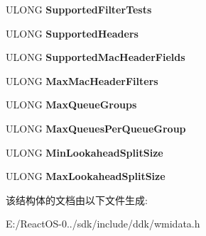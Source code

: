 \begin{DoxyCompactItemize}
U\+L\+O\+NG {\bfseries Supported\+Filter\+Tests}
\item 
\mbox{\label{struct___m_s_ndis___receive_filter_capabilities_a7f4ca155d39f9301cf1ddae7f67b23d5}} 
U\+L\+O\+NG {\bfseries Supported\+Headers}
\item 
\mbox{\label{struct___m_s_ndis___receive_filter_capabilities_a2ee21c94bab2245bd0a6757689ab5de5}} 
U\+L\+O\+NG {\bfseries Supported\+Mac\+Header\+Fields}
\item 
\mbox{\label{struct___m_s_ndis___receive_filter_capabilities_a095d9228914c6269e037776bd1787a7d}} 
U\+L\+O\+NG {\bfseries Max\+Mac\+Header\+Filters}
\item 
\mbox{\label{struct___m_s_ndis___receive_filter_capabilities_a2b1584d60f1bdd312d6ba45753659601}} 
U\+L\+O\+NG {\bfseries Max\+Queue\+Groups}
\item 
\mbox{\label{struct___m_s_ndis___receive_filter_capabilities_adce5e029b627315b59f88c5a45bd01b0}} 
U\+L\+O\+NG {\bfseries Max\+Queues\+Per\+Queue\+Group}
\item 
\mbox{\label{struct___m_s_ndis___receive_filter_capabilities_a026761cae134559cf41ca5727e85375c}} 
U\+L\+O\+NG {\bfseries Min\+Lookahead\+Split\+Size}
\item 
\mbox{\label{struct___m_s_ndis___receive_filter_capabilities_a0ca6243549833d375dced69c3544b736}} 
U\+L\+O\+NG {\bfseries Max\+Lookahead\+Split\+Size}
\end{DoxyCompactItemize}


该结构体的文档由以下文件生成\+:\begin{DoxyCompactItemize}
\item 
E\+:/\+React\+O\+S-\/0../sdk/include/ddk/wmidata.\+h\end{DoxyCompactItemize}
